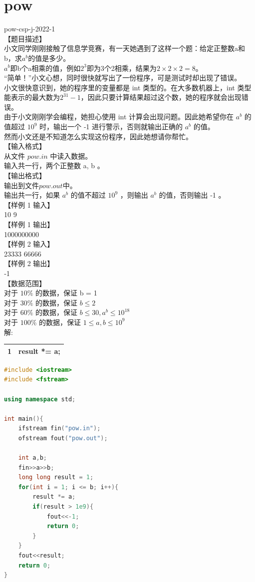 \documentclass[12pt,twiside,a4paper]{ctexbook}
\numberwithin{chapter}{part}
\begin{document}
\section{pow}
pow-csp-j-2022-1\\
【题目描述】\\
小文同学刚刚接触了信息学竞赛，有一天她遇到了这样一个题：给定正整数a和b，求$a^b$的值是多少。\\
$a^b$即b个a相乘的值，例如$2^3$即为3个2相乘，结果为$2\times2\times2=8$。\\
“简单！”小文心想，同时很快就写出了一份程序，可是测试时却出现了错误。\\
小文很快意识到，她的程序里的变量都是 int 类型的。在大多数机器上，int 类型
能表示的最大数为$2^{31}−1$，因此只要计算结果超过这个数，她的程序就会出现错误。\\
由于小文刚刚学会编程，她担心使用 int 计算会出现问题。因此她希望你在 $a^b$ 的
值超过 $10^9$ 时，输出一个 ‐1 进行警示，否则就输出正确的 $a^b$ 的值。\\
然而小文还是不知道怎么实现这份程序，因此她想请你帮忙。\\
【输入格式】\\
从文件 $pow.in$ 中读入数据。\\
输入共一行，两个正整数 a, b 。\\
【输出格式】\\
输出到文件$pow.out$中。\\
输出共一行，如果 $a^b$ 的值不超过 $10^9$ ，则输出 $a^b$ 的值，否则输出 ‐1 。\\
【样例 1 输入】\\
10 9\\
【样例 1 输出】\\
1000000000\\
【样例 2 输入】\\
23333 66666\\
【样例 2 输出】\\
‐1\\
【数据范围】\\
对于 $10\%$ 的数据，保证 b = 1\\
对于 $30\%$ 的数据，保证 $b \leq 2$\\
对于 $60\%$ 的数据，保证 $b \leq 30, a^b \leq 10^{18}$\\
对于 $100\%$ 的数据，保证 $1 \leq a, b \leq 10^9$\\
解:\\
\begin{tabular}{|c|c|}
\hline
1 & result *= a;\\
\hline
\end{tabular}
\begin{lstlisting}[language=C++]
#include <iostream>
#include <fstream>

using namespace std;

int main(){
	ifstream fin("pow.in");
	ofstream fout("pow.out");

	int a,b;
	fin>>a>>b;
	long long result = 1;
	for(int i = 1; i <= b; i++){
		result *= a;
		if(result > 1e9){
			fout<<-1;
			return 0;
		}
	}
	fout<<result;
	return 0;
}
\end{lstlisting}
\end{document}
